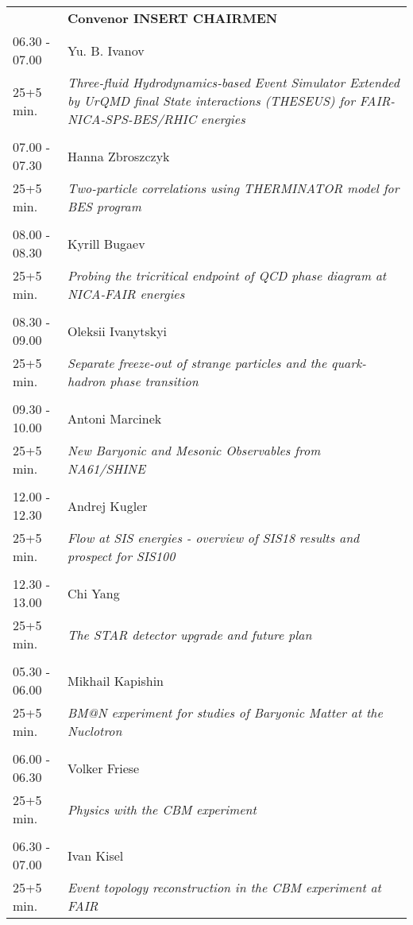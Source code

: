 \begin{longtable}{p{3cm}p{13cm}}
&\hfill {\bf Convenor INSERT CHAIRMEN }\\ 
06.30 - 07.00 & Yu. B.  Ivanov\\ 
25+5 min. & {\it Three-fluid Hydrodynamics-based Event Simulator Extended by UrQMD final State interactions  (THESEUS) for FAIR-NICA-SPS-BES/RHIC energies}\\ 
 & \\ 
07.00 - 07.30 & Hanna Zbroszczyk\\ 
25+5 min. & {\it Two-particle correlations using THERMINATOR model for BES program}\\ 
 & \\ 
08.00 - 08.30 & Kyrill Bugaev\\ 
25+5 min. & {\it Probing the tricritical endpoint of QCD phase diagram at NICA-FAIR energies}\\ 
 & \\ 
08.30 - 09.00 & Oleksii Ivanytskyi\\ 
25+5 min. & {\it Separate freeze-out of strange particles and the quark-hadron phase transition}\\ 
 & \\ 
09.30 - 10.00 & Antoni Marcinek\\ 
25+5 min. & {\it New Baryonic and Mesonic Observables from NA61/SHINE}\\ 
 & \\ 
12.00 - 12.30 & Andrej Kugler\\ 
25+5 min. & {\it Flow at SIS energies - overview of SIS18 results and prospect for SIS100}\\ 
 & \\ 
12.30 - 13.00 & Chi Yang\\ 
25+5 min. & {\it The STAR detector upgrade and future plan}\\ 
 & \\ 
05.30 - 06.00 & Mikhail Kapishin\\ 
25+5 min. & {\it BM@N experiment for studies of Baryonic Matter at the Nuclotron}\\ 
 & \\ 
06.00 - 06.30 & Volker Friese\\ 
25+5 min. & {\it Physics with the CBM experiment}\\ 
 & \\ 
06.30 - 07.00 & Ivan Kisel\\ 
25+5 min. & {\it Event topology reconstruction in the CBM experiment at FAIR}\\ 

\end{longtable}
